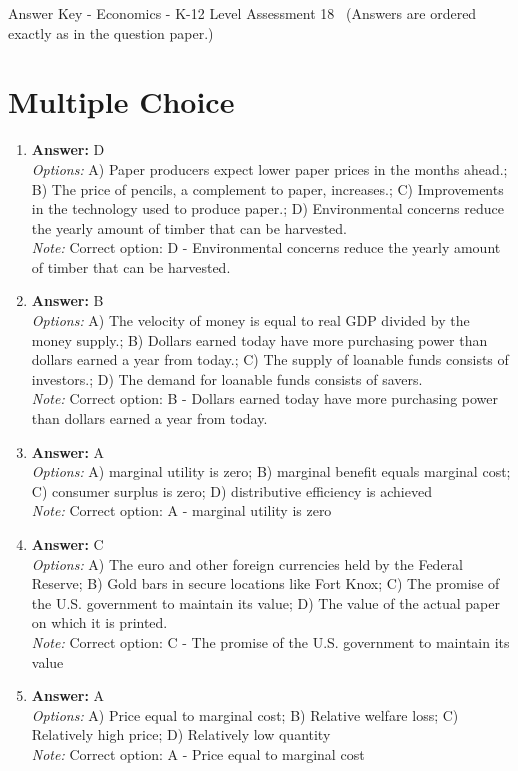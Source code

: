 \documentclass[12pt]{article}
\begin{document}
\begin{center}
Answer Key - Economics - K-12 Level Assessment 18 \
\small (Answers are ordered exactly as in the question paper.)
\end{center}

\section*{Multiple Choice}
\begin{enumerate}[label=\arabic*.]
\item \textbf{Answer:} D
\\ \textit{Options:} A) Paper producers expect lower paper prices in the months ahead.; B) The price of pencils, a complement to paper, increases.; C) Improvements in the technology used to produce paper.; D) Environmental concerns reduce the yearly amount of timber that can be harvested.
\\ \textit{Note:} Correct option: D - Environmental concerns reduce the yearly amount of timber that can be harvested.
\item \textbf{Answer:} B
\\ \textit{Options:} A) The velocity of money is equal to real GDP divided by the money supply.; B) Dollars earned today have more purchasing power than dollars earned a year from today.; C) The supply of loanable funds consists of investors.; D) The demand for loanable funds consists of savers.
\\ \textit{Note:} Correct option: B - Dollars earned today have more purchasing power than dollars earned a year from today.
\item \textbf{Answer:} A
\\ \textit{Options:} A) marginal utility is zero; B) marginal benefit equals marginal cost; C) consumer surplus is zero; D) distributive efficiency is achieved
\\ \textit{Note:} Correct option: A - marginal utility is zero
\item \textbf{Answer:} C
\\ \textit{Options:} A) The euro and other foreign currencies held by the Federal Reserve; B) Gold bars in secure locations like Fort Knox; C) The promise of the U.S. government to maintain its value; D) The value of the actual paper on which it is printed.
\\ \textit{Note:} Correct option: C - The promise of the U.S. government to maintain its value
\item \textbf{Answer:} A
\\ \textit{Options:} A) Price equal to marginal cost; B) Relative welfare loss; C) Relatively high price; D) Relatively low quantity
\\ \textit{Note:} Correct option: A - Price equal to marginal cost
\end{enumerate}
\end{document}
